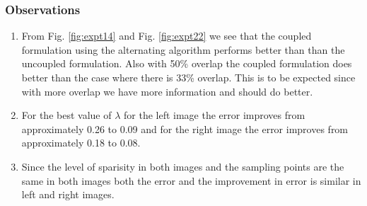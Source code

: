 \subsubsection{Observations}
\begin{enumerate}

\item From Fig. \ref{fig:expt14} and Fig. \ref{fig:expt22} we see that the coupled formulation using the alternating algorithm performs better than than the uncoupled formulation. Also with 50\% overlap the coupled formulation does better than the case where there is 33\% overlap. This is to be expected since with more overlap we have more information and should do better.
\item For the best value of $\lambda$ for the left image the error improves from approximately 0.26 to 0.09 and for the right image the error improves from approximately 0.18 to 0.08.
\item Since the level of sparisity in both images and the sampling points are the same in both images both the error and the improvement in error is similar in left and right images.
\end{enumerate}


